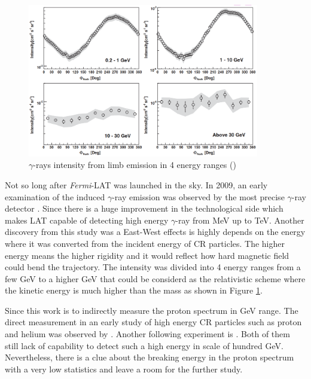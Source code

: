 \begin{figure}[h!]
    \centering
    \includegraphics[width=0.9\textwidth]{content/literature_review/figures/fermi_eastwest.png}
    \caption{
        $\gamma$-rays intensity from limb emission in 4 energy ranges
        (\cite{fermilat_gamma_induced})
    }
    \label{fig:fermi_eastwest}
\end{figure}

Not so long after \textit{Fermi}-LAT was launched in the sky. In 2009,
an early examination of the induced $\gamma$-ray emission was 
observed by the most precise $\gamma$-ray detector
\cite{fermilat_gamma_induced}. Since there 
is a huge improvement in the technological side which makes LAT 
capable of detecting high energy $\gamma$-ray from MeV up to TeV.
Another discovery from this study was a East-West effects is highly 
depends on the energy where it was converted from the incident 
energy of CR particles. The higher energy means the higher rigidity
and it would reflect how hard magnetic field could bend the trajectory.
The intensity was divided into 4 energy ranges from a few GeV 
to a higher GeV that could be considerd as the relativistic scheme 
where the kinetic energy is much higher than the mass as shown 
in Figure \ref{fig:fermi_eastwest}.

Since this work is to indirectly measure the proton spectrum in 
GeV range. The direct measurement in an early study of high energy 
CR particles such as proton and helium was observed by \cite{bess_experiment}.
Another following experiment is \cite{adriani2011pamela}. Both of 
them still lack of capability to detect such a high energy in scale of 
hundred GeV. Nevertheless, there is a clue about the breaking energy 
in the proton spectrum with a very low statistics and leave 
a room for the further study.


